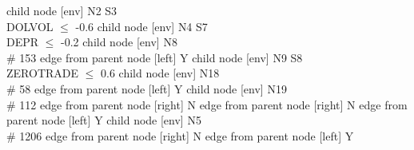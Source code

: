 
      child { node [env] {N2  S3 \\ DOLVOL $\leq$ -0.6} 
            child { node [env] {N4  S7 \\ DEPR $\leq$ -0.2} 
                  child { node [env] {N8   \\ \# 153 } 
                        edge from parent node [left] {Y} 
                  }
                  child { node [env] {N9  S8 \\ ZEROTRADE $\leq$ 0.6} 
                        child { node [env] {N18   \\ \# 58 } 
                              edge from parent node [left] {Y} 
                        }
                        child { node [env] {N19   \\ \# 112 } 
                              edge from parent node [right] {N} 
                        }
                        edge from parent node [right] {N} 
                  }
                  edge from parent node [left] {Y} 
            }
            child { node [env] {N5   \\ \# 1206 } 
                  edge from parent node [right] {N} 
            }
            edge from parent node [left] {Y} 
      }

